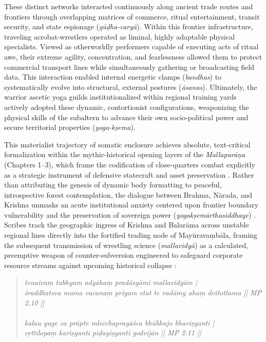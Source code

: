 \documentclass[11pt,twoside,letterpaper]{article}
\begin{document}
These distinct networks interacted continuously along ancient trade routes and frontiers through overlapping matrices of commerce, ritual entertainment, transit security, and state espionage (\textit{gūḍha-caryā}). Within this frontier infrastructure, traveling acrobat-wrestlers operated as liminal, highly adaptable physical specialists. Viewed as otherworldly performers capable of executing acts of ritual awe, their extreme agility, concentration, and fearlessness allowed them to protect commercial transport lines while simultaneously gathering or broadcasting field data. This interaction enabled internal energetic clamps (\textit{bandhas}) to systematically evolve into structural, external postures (\textit{āsanas}). Ultimately, the warrior ascetic yoga guilds institutionalized within regional training yards actively adopted these dynamic, contortionist configurations, weaponizing the physical skills of the subaltern to advance their own socio-political power and secure territorial properties (\textit{yoga-kṣema}).

This materialist trajectory of somatic enclosure achieves absolute, text-critical formalization within the mythic-historical opening layers of the \textit{Mallapurāṇa} (Chapters 1--3), which frame the codification of close-quarters combat explicitly as a strategic instrument of defensive statecraft and asset preservation \citep{MP_7}. Rather than attributing the genesis of dynamic body formatting to peaceful, introspective forest contemplation, the dialogue between Brahma, Nārada, and Krishna unmasks an acute institutional anxiety centered upon frontier boundary vulnerability and the preservation of sovereign power (\textit{yogakṣemārthasiddhaye}) \citep{MP_7}. Scribes track the geographic ingress of Krishna and Balarāma across unstable regional lines directly into the fortified trading node of Mayūravaṃbāla, framing the subsequent transmission of wrestling science (\textit{mallavidyā}) as a calculated, preemptive weapon of counter-subversion engineered to safeguard corporate resource streams against upcoming historical collapse \citep{MP_7}:

\begin{quote}
\small
\textit{tenaivaṃ tubhyam adyāhaṃ pradāsyāmi mallavidyām | \\
śraddhatsva mama vacanaṃ priyam etat te vadāmy ahaṃ dvitottama || MP 2.10 || \\
\\
kalau yuge ca prāpte mlecchaprayāśca bhūbhujo bhaviṣyanti | \\
vṛttilopaṃ kariṣyanti pīḍayiṣyanti godvijān || MP 2.11 ||}
\end{quote}
\end{document}
